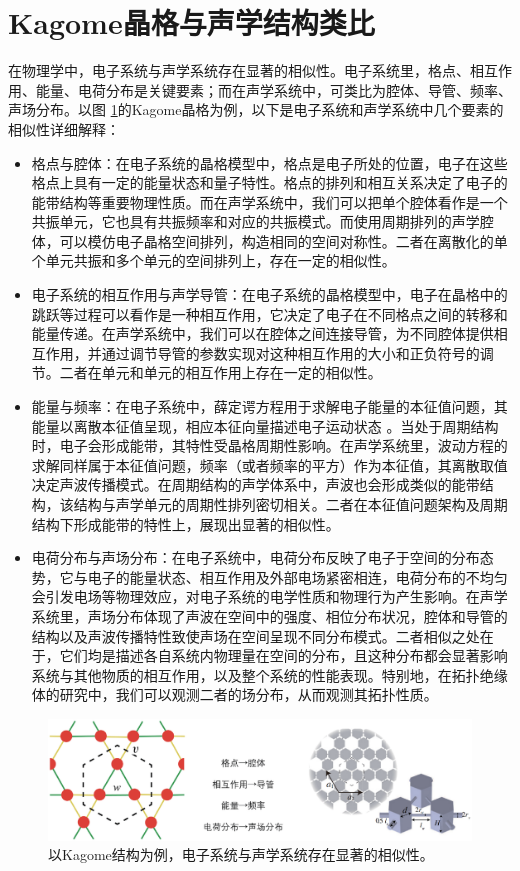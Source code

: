 \section{Kagome晶格与声学结构类比}

在物理学中，电子系统与声学系统存在显著的相似性。电子系统里，格点、相互作用、能量、电荷分布是关键要素；而在声学系统中，可类比为腔体、导管、频率、声场分布。以图 \ref{fig_3_1}的Kagome晶格为例，以下是电子系统和声学系统中几个要素的相似性详细解释：
\begin{itemize}
  \item 格点与腔体：在电子系统的晶格模型中，格点是电子所处的位置，电子在这些格点上具有一定的能量状态和量子特性。格点的排列和相互关系决定了电子的能带结构等重要物理性质。而在声学系统中，我们可以把单个腔体看作是一个共振单元，它也具有共振频率和对应的共振模式。而使用周期排列的声学腔体，可以模仿电子晶格空间排列，构造相同的空间对称性。二者在离散化的单个单元共振和多个单元的空间排列上，存在一定的相似性。
  \item 电子系统的相互作用与声学导管：在电子系统的晶格模型中，电子在晶格中的跳跃等过程可以看作是一种相互作用，它决定了电子在不同格点之间的转移和能量传递。在声学系统中，我们可以在腔体之间连接导管，为不同腔体提供相互作用，并通过调节导管的参数实现对这种相互作用的大小和正负符号的调节。二者在单元和单元的相互作用上存在一定的相似性。
  \item 能量与频率：在电子系统中，薛定谔方程用于求解电子能量的本征值问题，其能量以离散本征值呈现，相应本征向量描述电子运动状态 。当处于周期结构时，电子会形成能带，其特性受晶格周期性影响。在声学系统里，波动方程的求解同样属于本征值问题，频率（或者频率的平方）作为本征值，其离散取值决定声波传播模式。在周期结构的声学体系中，声波也会形成类似的能带结构，该结构与声学单元的周期性排列密切相关。二者在本征值问题架构及周期结构下形成能带的特性上，展现出显著的相似性。 
  \item 电荷分布与声场分布：在电子系统中，电荷分布反映了电子于空间的分布态势，它与电子的能量状态、相互作用及外部电场紧密相连，电荷分布的不均匀会引发电场等物理效应，对电子系统的电学性质和物理行为产生影响。在声学系统里，声场分布体现了声波在空间中的强度、相位分布状况，腔体和导管的结构以及声波传播特性致使声场在空间呈现不同分布模式。二者相似之处在于，它们均是描述各自系统内物理量在空间的分布，且这种分布都会显著影响系统与其他物质的相互作用，以及整个系统的性能表现。特别地，在拓扑绝缘体的研究中，我们可以观测二者的场分布，从而观测其拓扑性质。 
\end{itemize}

\begin{figure}[h!]
  \centering
  \includegraphics[width=1\textwidth]{images/fig3-1.eps} 
  \caption{以Kagome结构为例，电子系统与声学系统存在显著的相似性。}
  \label{fig_3_1}
\end{figure}

